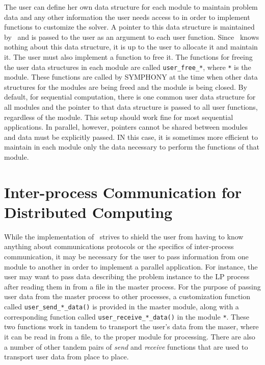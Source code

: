 The user can define her own data structure for each module to maintain problem
data and any other information the user needs access to in order to implement
functions to customize the solver. A pointer to this data structure is
maintained by \BB\ and is passed to the user as an argument to each user
function. Since \BB\ knows nothing about this data structure, it is up to the
user to allocate it and maintain it. The user must also implement a function
to free it. The functions for freeing the user data structures in each module
are called \texttt{user\_free\_*}, where \texttt{*} is the module. These
functions are called by SYMPHONY at the time when other data structures for
the modules are being freed and the module is being closed. By default, for
sequential computation, there is one common user data structure for all
modules and the pointer to that data structure is passed to all user
functions, regardless of the module. This setup should work fine for most
sequential applications. In parallel, however, pointers cannot be shared
between modules and data must be explicitly passed. IN this case, it is
sometimes more efficient to maintain in each module only the data necessary to
perform the functions of that module.

\section{Inter-process Communication for Distributed Computing}
\label{communication}
While the implementation of \BB\ strives to shield the user from having to
know anything about communications protocols or the specifics of inter-process
communication, it may be necessary for the user to pass information from one
module to another in order to implement a parallel application. For instance,
the user may want to pass data describing the problem instance to the LP
process after reading them in from a file in the master process. For the
purpose of passing user data from the master process to other processes, a
customization function called
\texttt{user\_send\_*\_data()} is provided in the master module, along with a
corresponding function called \texttt{user\_receive\_*\_data()} in the module
\texttt{*}. These two functions work in tandem to transport the user's data
from the maser, where it can be read in from a file, to the proper module for
processing. There are also a number of other tandem pairs of \emph{send} and
\emph{receive} functions that are used to transport user data from place to
place.

